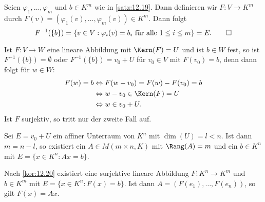\begin{beweis}
	Seien $\varphi_1,\dots,\varphi_m$ und $b \in K^m$ wie in \autoref{satz:12.19}.
	Dann definieren wir $F \colon V \rightarrow K^m$ durch $F(v) = (\varphi_1(v),\dots,\varphi_m(v)) \in K^m$.
	Dann folgt
	\[
		F^{-1}(\{b\}) = \{v \in V : \varphi_i(v) = b_i \text{ für alle } 1 \leq i \leq m\} = E. \qedhere
	\]
\end{beweis}

\begin{bemerkung}
	\label{bem:12.21}
	Ist $F \colon V \rightarrow W$ eine lineare Abbildung mit $\Kern(F) = U$ und ist $b \in W$ fest, so ist $F^{-1}(\{b\}) = \emptyset$ oder $F^{-1}(\{b\}) = v_0 + U$ für $v_0 \in V$ mit $F(v_0) = b$, denn dann folgt für $w \in W$:
	\begin{align*}
		F(w) = b &\Leftrightarrow F(w-v_0) = F(w) - F(v_0) = b \\
		&\Leftrightarrow w-v_0 \in \Kern(F) = U \\
		&\Leftrightarrow w \in v_0 + U.
	\end{align*}
	Ist $F$ surjektiv, so tritt nur der zweite Fall auf.
\end{bemerkung}

\begin{korollar}
	\label{kor:12.22}
	Sei $E = v_0 + U$ ein affiner Unterraum von $K^n$ mit $\dim(U) = l < n$.
	Ist dann $m = n-l$, so existiert ein $A \in M(m \times n,K)$ mit $\Rang(A) = m$ und ein $b \in K^n$ mit $E = \{x \in K^n : Ax = b\}$.
\end{korollar}

\begin{beweis}
	Nach \autoref{kor:12.20} existiert eine surjektive lineare Abbildung $F \colon K^n \rightarrow K^m$ und $b \in K^m$ mit $E = \{x \in K^n : F(x) = b\}$.
	Ist dann $A = (F(e_1),\dots,F(e_n))$, so gilt $F(x) = Ax$. \qedhere
\end{beweis}

